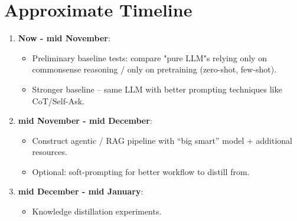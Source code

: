 \documentclass[10pt]{article}
\begin{document}
\section{Approximate Timeline}
\begin{enumerate}
	\item \textbf{Now - mid November}: 
		\begin{itemize}
  			\item Preliminary baseline tests: compare "pure LLM"s relying only on commonsense reasoning / only on pretraining (zero-shot, few-shot).
			\item Stronger baseline – same LLM with better prompting techniques like CoT/Self-Ask.
		\end{itemize}
	\item \textbf{mid November - mid December}:
		\begin{itemize}
  			\item Construct agentic / RAG pipeline with “big smart” model + additional resources.
  			\item Optional: soft-prompting for better workflow to distill from.
		\end{itemize}
	\item \textbf{mid December - mid January}:
  		\begin{itemize}
			\item Knowledge distillation experiments.
		\end{itemize}
\end{enumerate}

\printbibliography
\end{document}
